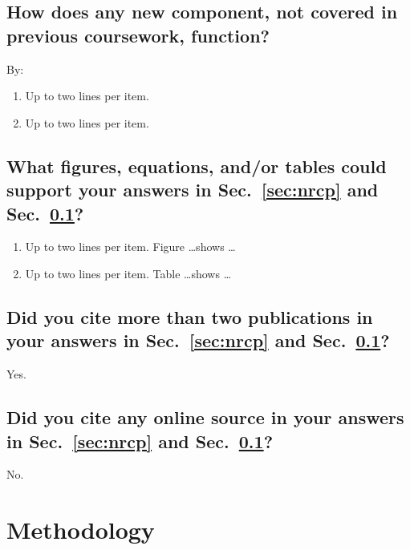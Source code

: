 \subsection{How does any new component, not covered in previous coursework, function?}
\label{sec:nfxn}
By:
\begin{enumerate}
\item Up to two lines per item.
\item Up to two lines per item.
\end{enumerate}
	
\subsection{What figures, equations, and/or tables could support your answers in Sec.~\ref{sec:nrcp} and Sec.~\ref{sec:nfxn}?}
\begin{enumerate}
\item Up to two lines per item. Figure \ldots shows \ldots
\item Up to two lines per item. Table \ldots shows \ldots
\end{enumerate}
	
\subsection{Did you cite more than two publications in your answers in Sec.~\ref{sec:nrcp} and Sec.~\ref{sec:nfxn}?}
Yes.
	
\subsection{Did you cite any online source in your answers in Sec.~\ref{sec:nrcp} and Sec.~\ref{sec:nfxn}?}
No.
  
	
	
	
	
	
	
	
	
	


\section{Methodology}

